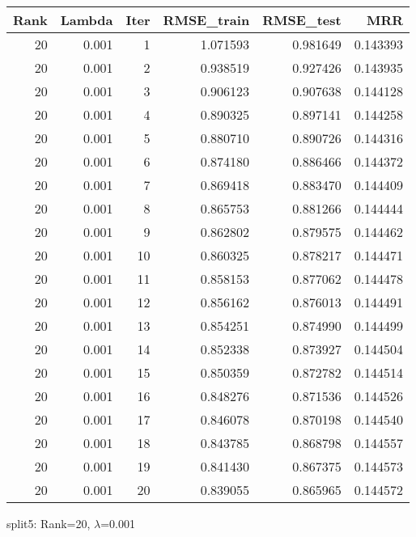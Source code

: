 \begin{tabular}{rrrrrr}
\toprule
 Rank &  Lambda &  Iter &  RMSE\_train &  RMSE\_test &       MRR \\
\midrule
   20 &   0.001 &     1 &    1.071593 &   0.981649 &  0.143393 \\
   20 &   0.001 &     2 &    0.938519 &   0.927426 &  0.143935 \\
   20 &   0.001 &     3 &    0.906123 &   0.907638 &  0.144128 \\
   20 &   0.001 &     4 &    0.890325 &   0.897141 &  0.144258 \\
   20 &   0.001 &     5 &    0.880710 &   0.890726 &  0.144316 \\
   20 &   0.001 &     6 &    0.874180 &   0.886466 &  0.144372 \\
   20 &   0.001 &     7 &    0.869418 &   0.883470 &  0.144409 \\
   20 &   0.001 &     8 &    0.865753 &   0.881266 &  0.144444 \\
   20 &   0.001 &     9 &    0.862802 &   0.879575 &  0.144462 \\
   20 &   0.001 &    10 &    0.860325 &   0.878217 &  0.144471 \\
   20 &   0.001 &    11 &    0.858153 &   0.877062 &  0.144478 \\
   20 &   0.001 &    12 &    0.856162 &   0.876013 &  0.144491 \\
   20 &   0.001 &    13 &    0.854251 &   0.874990 &  0.144499 \\
   20 &   0.001 &    14 &    0.852338 &   0.873927 &  0.144504 \\
   20 &   0.001 &    15 &    0.850359 &   0.872782 &  0.144514 \\
   20 &   0.001 &    16 &    0.848276 &   0.871536 &  0.144526 \\
   20 &   0.001 &    17 &    0.846078 &   0.870198 &  0.144540 \\
   20 &   0.001 &    18 &    0.843785 &   0.868798 &  0.144557 \\
   20 &   0.001 &    19 &    0.841430 &   0.867375 &  0.144573 \\
   20 &   0.001 &    20 &    0.839055 &   0.865965 &  0.144572 \\
\bottomrule
\end{tabular}

\caption{split5: Rank=20, $\lambda$=0.001}
